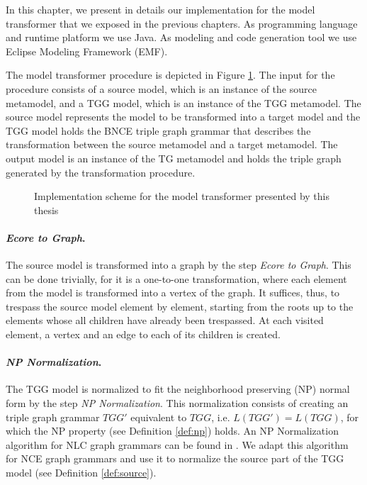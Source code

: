 In this chapter, we present in details our implementation for the model transformer that we exposed in the previous chapters. As programming language and runtime platform we use Java. As modeling and code generation tool we use Eclipse Modeling Framework (EMF).


The model transformer procedure is depicted in Figure \ref{fig:implementation-scheme}. The input for the procedure consists of a source model, which is an instance of the source metamodel, and a TGG model, which is an instance of the TGG metamodel. The source model represents the model to be transformed into a target model and the TGG model holds the BNCE triple graph grammar that describes the transformation between the source metamodel and a target metamodel. The output model is an instance of the TG metamodel and holds the triple graph generated by the transformation procedure.

\begin{figure}[h]
	
	\caption{Implementation scheme for the model transformer presented by this thesis}
	\label{fig:implementation-scheme}
\end{figure}

\paragraph*{\emph{Ecore to Graph}.} The source model is transformed into a graph by the step \emph{Ecore to Graph}. This can be done trivially, for it is a one-to-one transformation, where each element from the model is transformed into a vertex of the graph. It suffices, thus, to trespass the source model element by element, starting from the roots up to the elements whose all children have already been trespassed. At each visited element, a vertex and an edge to each of its children is created.

\paragraph*{\emph{NP Normalization}.} The TGG model is normalized to fit the neighborhood preserving (NP) normal form by the step \emph{NP Normalization}. This normalization consists of creating an triple graph grammar $TGG'$ equivalent to $TGG$, i.e. $L(TGG') = L(TGG)$, for which the NP property (see Definition \ref{def:np}) holds. An NP Normalization algorithm for NLC graph grammars can be found in \citep{rozenberg1986boundary}. We adapt this algorithm for NCE graph grammars and use it to normalize the source part of the TGG model (see Definition \ref{def:source}).

